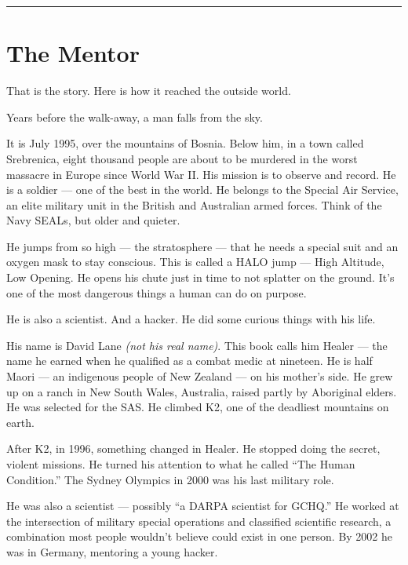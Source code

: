 \vspace{1cm}\noindent\rule{0.5\textwidth}{0.5pt}\vspace{0.5cm}

\section*{The Mentor}
\label{front:the-mentor}

That is the story. Here is how it reached the outside world.

Years before the walk-away, a man falls from the sky.

It is July 1995, over the mountains of Bosnia. Below him, in a town called Srebrenica, eight thousand people are about to be murdered in the worst massacre in Europe since World War II\@. His mission is to observe and record. He is a soldier --- one of the best in the world. He belongs to the Special Air Service, an elite military unit in the British and Australian armed forces. Think of the Navy SEALs, but older and quieter.

He jumps from so high --- the stratosphere --- that he needs a special suit and an oxygen mask to stay conscious. This is called a HALO jump --- High Altitude, Low Opening. He opens his chute just in time to not splatter on the ground. It's one of the most dangerous things a human can do on purpose.

He is also a scientist. And a hacker. He did some curious things with his life.

His name is David Lane \textit{(not his real name)}. This book calls him Healer --- the name he earned when he qualified as a combat medic at nineteen. He is half Maori --- an indigenous people of New Zealand --- on his mother's side. He grew up on a ranch in New South Wales, Australia, raised partly by Aboriginal elders. He was selected for the SAS\@. He climbed K2, one of the deadliest mountains on earth.

After K2, in 1996, something changed in Healer. He stopped doing the secret, violent missions. He turned his attention to what he called ``The Human Condition.'' The Sydney Olympics in 2000 was his last military role.

He was also a scientist --- possibly ``a DARPA scientist for GCHQ\@.'' He worked at the intersection of military special operations and classified scientific research, a combination most people wouldn't believe could exist in one person. By 2002 he was in Germany, mentoring a young hacker.

